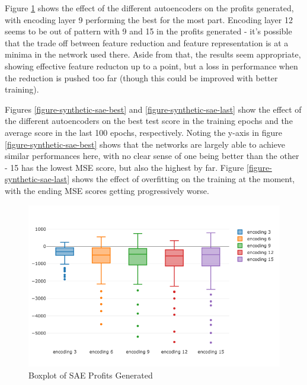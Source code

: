 \documentclass[a4paper,latin]{paper}
\begin{document}
Figure \ref{figure-synthetic-sae-profit} shows the effect of the different autoencoders on the profits generated, with encoding layer 9 performing the best for the most part. Encoding layer 12 seems to be out of pattern with 9 and 15 in the profits generated - it's possible that the trade off between feature reduction and feature representation is at a minima in the network used there. Aside from that, the results seem appropriate, showing effective feature reducton up to a point, but a loss in performance when the reduction is pushed too far (though this could be improved with better training).\newline

Figures \ref{figure-synthetic-sae-best} and \ref{figure-synthetic-sae-last} show the effect of the different autoencoders on the best test score in the training epochs and the average score in the last 100 epochs, respectively. Noting the y-axis in figure \ref{figure-synthetic-sae-best} shows that the networks are largely able to achieve similar performances here, with no clear sense of one being better than the other - 15 has the lowest MSE score, but also the highest by far. Figure \ref{figure-synthetic-sae-last}  shows the effect of overfitting on the training at the moment, with the ending MSE scores getting progressively worse.

\begin{figure}[H]
	\centering \includegraphics[scale=0.5]{images/synthetic_results/boxplot_sae_profit.png}
	\caption{Boxplot of SAE Profits Generated}
	\label{figure-synthetic-sae-profit}
\end{figure}
\end{document}
